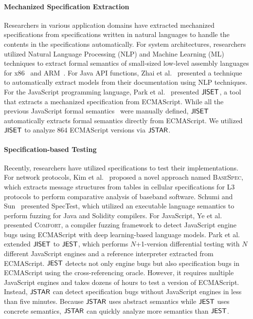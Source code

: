 \paragraph{Mechanized Specification Extraction}
Researchers in various application domains have extracted mechanized specifications from
specifications written in natural languages to handle the contents in the specifications automatically.
For system architectures, researchers utilized Natural
Language Processing (NLP) and Machine Learning (ML) techniques to extract formal semantics
of small-sized low-level assembly languages for x86~\cite{x86} and ARM~\cite{arm}.
For Java API functions, Zhai et al.~\cite{javadoc} presented a
technique to automatically extract models from their documentation using NLP techniques.
For the JavaScript programming language, Park et al.~\cite{jiset}
presented $\jiset$, a tool that extracts a mechanized specification from ECMAScript.
While all the previous JavaScript formal semantics~\cite{lambdajs, jscert,
kjs} were manually defined, $\jiset$ automatically extracts formal semantics directly from ECMAScript.
We utilized $\jiset$ to analyze 864 ECMAScript versions via $\tool$.

\paragraph{Specification-based Testing}
Recently, researchers have utilized specifications to test their implementations.
For network protocols, Kim et al.~\cite{basespec} proposed a novel approach named
\textsc{BaseSpec}, which extracts message structures from tables in cellular
specifications for L3 protocols to perform comparative analysis of baseband software.
Schumi and Sun~\cite{spectest} presented SpecTest, which utilized an
executable language semantics to perform fuzzing for Java and Solidity compilers.
For JavaScript, Ye et al.~\cite{comfort} presented \textsc{Comfort}, a
compiler fuzzing framework to detect JavaScript engine bugs using ECMAScript
with deep learning-based language models.
Park et al.~\cite{jest} extended $\jiset$ to $\jest$, which performs $N$+1-version differential testing
with $N$ different JavaScript engines and a reference interpreter extracted from ECMAScript.
$\jest$ detects not only engine bugs but also specification bugs in
ECMAScript using the cross-referencing oracle.  However, it requires multiple JavaScript engines and
takes dozens of hours to test a version of ECMAScript.
Instead, $\tool$ can detect specification bugs without JavaScript engines in less than five minutes.
Because $\tool$ uses abstract semantics while $\jest$ uses concrete semantics,
$\tool$ can quickly analyze more semantics than $\jest$.
